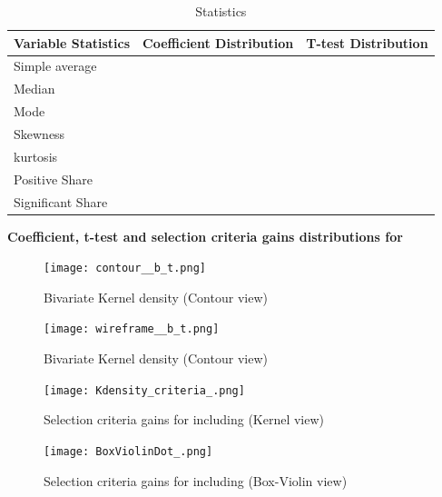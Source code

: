 \documentclass{article}
\begin{document}
\begin{table}[!h]
    \centering
    \caption{Statistics}
    \begin{tabular}{|l|c|c|}
    \hline
    Variable  Statistics &  Coefficient Distribution &  T-test Distribution  \\
    \hline
    \hline
    Simple average    &       &  \\
    \hline
    Median            &    &  \\
    \hline
    Mode              &      &  \\
    \hline
    Skewness          &       &  \\
    \hline
    kurtosis          &      &  \\
    \hline
    Positive Share    &      &  \\
    \hline
    Significant Share &  &  \\
    \hline
    \end{tabular}
\end{table}

\clearpage
\begin{center}
    \large{\textbf{Coefficient, t-test and selection criteria gains distributions for  }}
\end{center}

\vspace{-5mm}

\begin{figure}[!ht]
  \centering
  \begin{minipage}[b]{0.46\textwidth}
    \centering
    \texttt{[image: contour\_\_b\_t.png]}
    \caption{Bivariate Kernel density (Contour view)}
  \end{minipage}
  \hfill
  \begin{minipage}[b]{0.53\textwidth}
    \centering
    \texttt{[image: wireframe\_\_b\_t.png]}
    \caption{Bivariate Kernel density (Contour view)}
  \end{minipage}

  \begin{minipage}[b]{0.48\textwidth}
    \centering
    \texttt{[image: Kdensity\_criteria\_.png]}
    \caption{Selection criteria gains for including  (Kernel view)}
  \end{minipage}
  \hfill
  \begin{minipage}[b]{0.48\textwidth}
    \centering    
    \texttt{[image: BoxViolinDot\_.png]}
    \caption{Selection criteria gains for including  (Box-Violin view)}    
  \end{minipage}
\end{figure}
\end{document}

